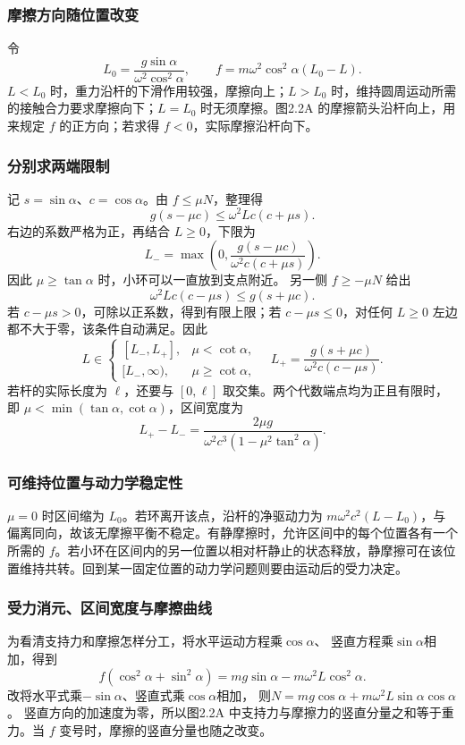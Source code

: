 \documentclass[UTF8,fontset=fandol,a4paper,11pt]{ctexart}
\begin{document}
\subsubsection*{摩擦方向随位置改变}
令
\[
L_0=\frac{g\sin\alpha}{\omega^2\cos^2\alpha},
\qquad f=m\omega^2\cos^2\alpha(L_0-L).
\]
$L<L_0$ 时，重力沿杆的下滑作用较强，摩擦向上；$L>L_0$ 时，维持圆周运动所需的接触合力要求摩擦向下；$L=L_0$ 时无须摩擦。图2.2A 的摩擦箭头沿杆向上，用来规定 $f$ 的正方向；若求得 $f<0$，实际摩擦沿杆向下。

\subsubsection*{分别求两端限制}
记 $s=\sin\alpha$、$c=\cos\alpha$。由 $f\leq\mu N$，整理得
\[
g(s-\mu c)\leq\omega^2Lc(c+\mu s).
\]
右边的系数严格为正，再结合 $L\geq0$，下限为
\[
\boxed{L_-=\max\left(0,\frac{g(s-\mu c)}{\omega^2c(c+\mu s)}\right)}.
\]
因此 $\mu\geq\tan\alpha$ 时，小环可以一直放到支点附近。
另一侧 $f\geq-\mu N$ 给出
\[
\omega^2Lc(c-\mu s)\leq g(s+\mu c).
\]
若 $c-\mu s>0$，可除以正系数，得到有限上限；若 $c-\mu s\leq0$，对任何 $L\geq0$ 左边都不大于零，该条件自动满足。因此
\[
\boxed{L\in\begin{cases}
[L_-,L_+],&\mu<\cot\alpha,\\
[L_-,\infty),&\mu\geq\cot\alpha,
\end{cases}\quad
L_+=\frac{g(s+\mu c)}{\omega^2c(c-\mu s)}}.
\]
若杆的实际长度为 $\ell$，还要与 $[0,\ell]$ 取交集。两个代数端点均为正且有限时，即 $\mu<\min(\tan\alpha,\cot\alpha)$，区间宽度为
\[
L_+-L_-=\frac{2\mu g}{\omega^2c^3(1-\mu^2\tan^2\alpha)}.
\]
\subsubsection*{可维持位置与动力学稳定性}
$\mu=0$ 时区间缩为 $L_0$。若环离开该点，沿杆的净驱动力为 $m\omega^2c^2(L-L_0)$，与偏离同向，故该无摩擦平衡不稳定。有静摩擦时，允许区间中的每个位置各有一个所需的 $f$。若小环在区间内的另一位置以相对杆静止的状态释放，静摩擦可在该位置维持共转。回到某一固定位置的动力学问题则要由运动后的受力决定。
\subsubsection*{受力消元、区间宽度与摩擦曲线}
为看清支持力和摩擦怎样分工，将水平运动方程乘$\cos\alpha$、
竖直方程乘$\sin\alpha$相加，得到
\[
f(\cos^2\alpha+\sin^2\alpha)
=mg\sin\alpha-m\omega^2L\cos^2\alpha.
\]
改将水平式乘$-\sin\alpha$、竖直式乘$\cos\alpha$相加，
则$N=mg\cos\alpha+m\omega^2L\sin\alpha\cos\alpha$。
竖直方向的加速度为零，所以图2.2A 中支持力与摩擦力的竖直分量之和等于重力。当 $f$ 变号时，摩擦的竖直分量也随之改变。
\end{document}
